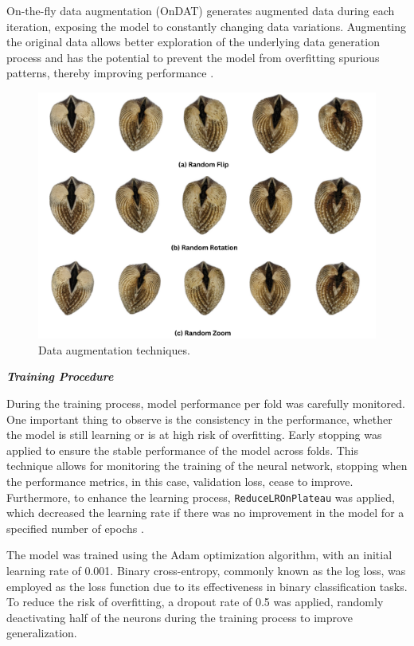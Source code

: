 On-the-fly data augmentation (OnDAT) generates augmented data during each iteration, exposing the model to constantly changing data variations. Augmenting the original data allows better exploration of the underlying data generation process and has the potential to prevent the model from overfitting spurious patterns, thereby improving performance \cite{cerqueira2024}.


\begin{figure}[h]
	\centering
	\includegraphics[width=\textwidth]{figures/data_augmentation.png}
	\caption{Data augmentation techniques.}
	\label{fig:data_augmentation}
\end{figure}

\textbf{\textit{Training Procedure}}

During the training process, model performance per fold was carefully monitored. One important thing to observe is the consistency in the performance, whether the model is still learning or is at high risk of overfitting. Early stopping was applied to ensure the stable performance of the model across folds. This technique allows for monitoring the training of the neural network, stopping when the performance metrics, in this case, validation loss, cease to improve. Furthermore, to enhance the learning process, \texttt{ReduceLROnPlateau} was applied, which decreased the learning rate if there was no improvement in the model for a specified number of epochs \cite{kerasTeam}.

The model was trained using the Adam optimization algorithm, with an initial learning rate of 0.001. Binary cross-entropy, commonly known as the log loss, was employed as the loss function due to its effectiveness in binary classification tasks. To reduce the risk of overfitting, a dropout rate of 0.5 was applied, randomly deactivating half of the neurons during the training process to improve generalization.


